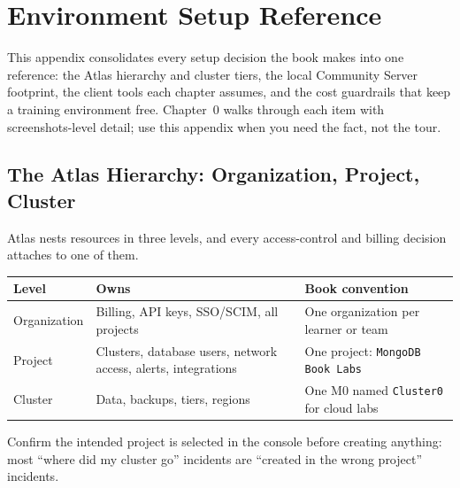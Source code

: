 \chapter{Environment Setup Reference}
%
This appendix consolidates every setup decision the book makes into one reference: the Atlas
hierarchy and cluster tiers, the local Community Server footprint, the client tools each chapter
assumes, and the cost guardrails that keep a training environment free. Chapter~0 walks through
each item with screenshots-level detail; use this appendix when you need the fact, not the tour.

\section{The Atlas Hierarchy: Organization, Project, Cluster}
%
Atlas nests resources in three levels, and every access-control and billing decision attaches to
one of them.

\begin{center}
\footnotesize
\begin{tabular}{@{}p{2.6cm}p{4.6cm}p{5.6cm}@{}}
\toprule
\textbf{Level} & \textbf{Owns} & \textbf{Book convention} \\
\midrule
Organization & Billing, API keys, SSO/SCIM, all projects & One organization per learner or team \\
Project & Clusters, database users, network access, alerts, integrations & One project: \texttt{MongoDB Book Labs} \\
Cluster & Data, backups, tiers, regions & One M0 named \texttt{Cluster0} for cloud labs \\
\bottomrule
\end{tabular}
\end{center}

\noindent Confirm the intended project is selected in the console before creating anything: most
``where did my cluster go'' incidents are ``created in the wrong project'' incidents.

